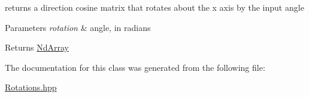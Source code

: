 returns a direction cosine matrix that rotates about the x axis by the input angle


\begin{DoxyParams}{Parameters}
{\em rotation} & angle, in radians \\
\hline
\end{DoxyParams}
\begin{DoxyReturn}{Returns}
\mbox{\hyperlink{class_num_cpp_1_1_nd_array}{Nd\+Array}} 
\end{DoxyReturn}


The documentation for this class was generated from the following file\+:\begin{DoxyCompactItemize}
\item 
\mbox{\hyperlink{_rotations_8hpp}{Rotations.\+hpp}}\end{DoxyCompactItemize}

